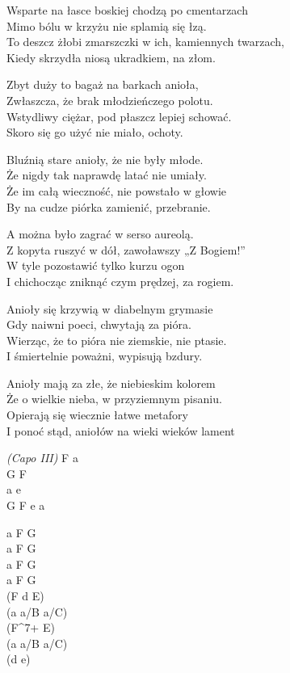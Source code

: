\begin{text}
    \hfill\break
Wsparte na łasce boskiej chodzą po cmentarzach\\
Mimo bólu w krzyżu nie splamią się łzą.\\
To deszcz żłobi zmarszczki w ich, kamiennych twarzach,\\
Kiedy skrzydła niosą ukradkiem, na złom.

Zbyt duży to bagaż na barkach anioła,\\
Zwłaszcza, że brak młodzieńczego polotu.\\
Wstydliwy ciężar, pod płaszcz lepiej schować.\\
Skoro się go użyć nie miało, ochoty.

Bluźnią stare anioły, że nie były młode.\\
Że nigdy tak naprawdę latać nie umiały.\\
Że im całą wieczność, nie powstało w głowie\\
By na cudze piórka zamienić, przebranie.

A można było zagrać w serso aureolą.\\
Z kopyta ruszyć w dół, zawoławszy „Z Bogiem!”\\
W tyle pozostawić tylko kurzu ogon\\
I chichocząc zniknąć czym prędzej, za rogiem.

Anioły się krzywią w diabelnym grymasie\\
Gdy naiwni poeci, chwytają za pióra.\\
Wierząc, że to pióra nie ziemskie, nie ptasie.\\
I śmiertelnie poważni, wypisują bzdury.

Anioły mają za złe, że niebieskim kolorem\\
Że o wielkie nieba, w przyziemnym pisaniu.\\
Opierają się wiecznie łatwe metafory\\
I ponoć stąd, aniołów na wieki wieków lament
\end{text}
\begin{chord}
    \textit{(Capo III)}
    F a\\
    G F\\
    a e\\
    G F e a

    a F G\\
    a F G\\
    a F G\\
    a F G\\
    (F d E)\\
    (a a/B a/C)\\
    (F^{7+} E)\\
    (a a/B a/C)\\
    (d e)
\end{chord}